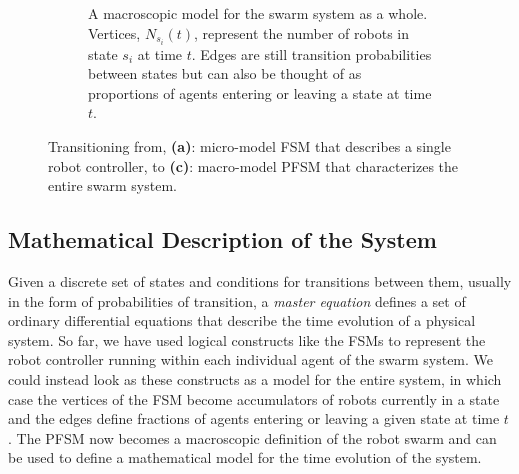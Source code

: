 \documentclass[Main.tex]{subfiles}
\begin{document}
\begin{figure}[!t]
\begin{subfigure}[t]{.4\textwidth}
	\caption{A macroscopic model for the swarm system as a whole. Vertices, $N_{s_i}(t)$, represent the number of robots in state $s_i$ at time $t$. Edges are still transition probabilities between states but can also be thought of as proportions of agents entering or leaving a state at time $t$.}\label{fig:pfsmmacro}
	\end{subfigure}
\caption{Transitioning from, \textbf{(a)}: micro-model FSM that describes a single robot controller, to \textbf{(c)}: macro-model PFSM that characterizes the entire swarm system.}\label{fig:allfsm}
\end{figure}

\subsection{Mathematical Description of the System}
Given a discrete set of states and conditions for transitions between them, usually in the form of probabilities of transition, a \emph{master equation} defines a set of ordinary differential equations that describe the time evolution of a physical system. So far, we have used logical constructs like the FSMs to represent the robot controller running within each individual agent of the swarm system. We could instead look as these constructs as a model for the entire system, in which case the vertices of the FSM become accumulators of robots currently in a state and the edges define fractions of agents entering or leaving a given state at time $t$. The PFSM now becomes a macroscopic definition of the robot swarm and can be used to define a mathematical model for the time evolution of the system.
\end{document}
